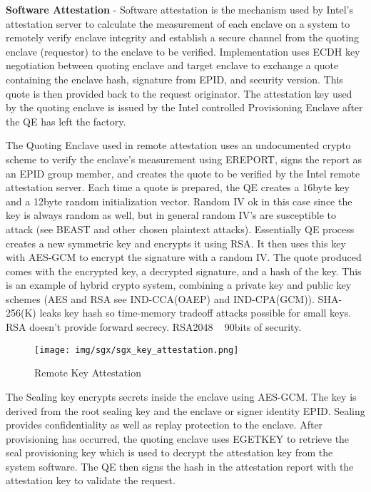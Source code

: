 \textbf{Software Attestation} - Software attestation is the mechanism used by Intel's attestation server to calculate the measurement of each enclave on a system to remotely verify enclave integrity and establish a secure channel from the quoting enclave (requestor) to the enclave to be verified. Implementation uses ECDH key negotiation between quoting enclave and target enclave to exchange a quote containing the enclave hash, signature from EPID, and security version. This quote is then provided back to the request originator. The attestation key used by the quoting enclave is issued by the Intel controlled Provisioning Enclave after the QE has left the factory. 


The Quoting Enclave used in remote attestation uses an undocumented crypto scheme to verify the enclave's measurement using EREPORT, signs the report as an EPID group member, and creates the quote to be verified by the Intel remote attestation server. Each time a quote is prepared, the QE creates a 16byte key and a 12byte random initialization vector. Random IV ok in this case since the key is always random as well, but in general random IV's are susceptible to attack (see BEAST and other chosen plaintext attacks). Essentially QE process creates a new symmetric key and encrypts it using RSA. It then uses this key with AES-GCM to encrypt the signature with a random IV. The quote produced comes with the encrypted key, a decrypted signature, and a hash of the key. This is an example of hybrid crypto system, combining a private key and public key schemes (AES and RSA see IND-CCA(OAEP) and IND-CPA(GCM)). SHA-256(K) leaks key hash so time-memory tradeoff attacks possible for small keys. RSA doesn't provide forward secrecy. RSA2048 ~ 90bits of security. 


\begin{figure}[H]
\centering
\texttt{[image: img/sgx/sgx\_key\_attestation.png]}
\caption{Remote Key Attestation \protect\cite{Costan_Devadas_2016}}
\end{figure}

The Sealing key encrypts secrets inside the enclave using AES-GCM. The key is derived from the root sealing key and the enclave or signer identity EPID. Sealing provides confidentiality as well as replay protection to the enclave. After provisioning has occurred, the quoting enclave uses EGETKEY to retrieve the seal provisioning key which is used to decrypt the attestation key from the system software. The QE then signs the hash in the attestation report with the attestation key to validate the request.

